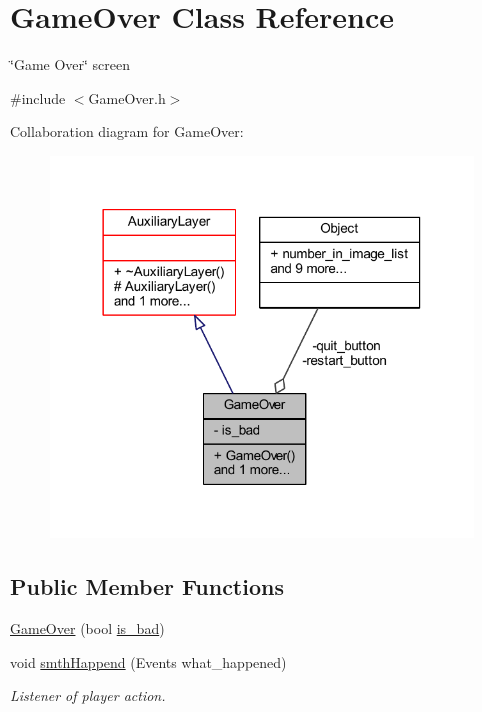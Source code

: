\hypertarget{class_game_over}{}\section{Game\+Over Class Reference}
\label{class_game_over}


\char`\"{}\+Game Over\char`\"{} screen  




{\ttfamily \#include $<$Game\+Over.\+h$>$}



Collaboration diagram for Game\+Over\+:\nopagebreak
\begin{figure}[H]
\begin{center}
\leavevmode
\includegraphics[width=318pt]{class_game_over__coll__graph}
\end{center}
\end{figure}
\subsection*{Public Member Functions}
\begin{DoxyCompactItemize}
\item 
\hyperlink{class_game_over_a3eb13fd94a63ff6dace1e1265b0c535d}{Game\+Over} (bool \hyperlink{class_game_over_a4a7103cf4db129cad83b0c001c32d116}{is\+\_\+bad})
\item 
void \hyperlink{class_game_over_a919e7ac37c476bf288f732f9a8106016}{smth\+Happend} (Events what\+\_\+happened)
\begin{DoxyCompactList}\small\item\em Listener of player action. \end{DoxyCompactList}\end{DoxyCompactItemize}
